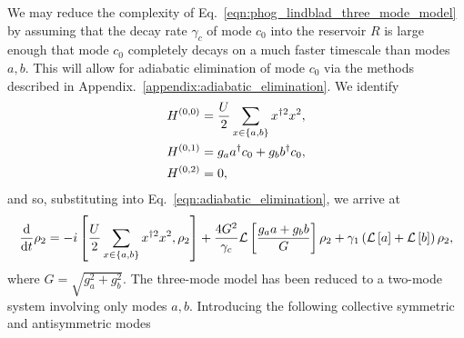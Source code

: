 We may reduce the complexity of Eq.~\ref{eqn:phog_lindblad_three_mode_model} by assuming that the decay rate $\gamma_c$ of mode $c_0$ into the reservoir $R$ is large enough that mode $c_0$ completely decays on a much faster timescale than modes $a, b$. This will allow for adiabatic elimination of mode $c_0$ via the methods described in Appendix.~\ref{appendix:adiabatic_elimination}. We identify
\begin{align}
&H^{\left(0, 0\right)} = \frac{U}{2} \sum_{x \in \left\{a, b\right\}} x^{\dagger 2} x^2, \notag \\
%
&H^{\left(0, 1\right)} = g_a a^\dagger c_0 + g_b b^\dagger c_0, \notag \\
%
&H^{\left(0, 2\right)} = 0,
\end{align}
and so, substituting into Eq.~\ref{eqn:adiabatic_elimination}, we arrive at
\begin{equation}\label{eqn:phog_two_mode_model_deriv}
\frac{\mathrm{d}}{\mathrm{d}t} \rho_2 = - i \left[\frac{U}{2} \sum_{x \in \left\{a, b\right\}} x^{\dagger 2} x^2, \rho_2\right] + \frac{4 G^2}{\gamma_c} \mathcal{L}\left[\frac{g_a a + g_b b}{G} \right]\rho_2 + \gamma_1 \left(\mathcal{L}\left[a\right] + \mathcal{L}\left[b\right]\right)\rho_2,
\end{equation}
where $G = \sqrt{g_a^2 + g_b^2}$. The three-mode model has been reduced to a two-mode system involving only modes $a, b$. Introducing the following collective symmetric and antisymmetric modes

